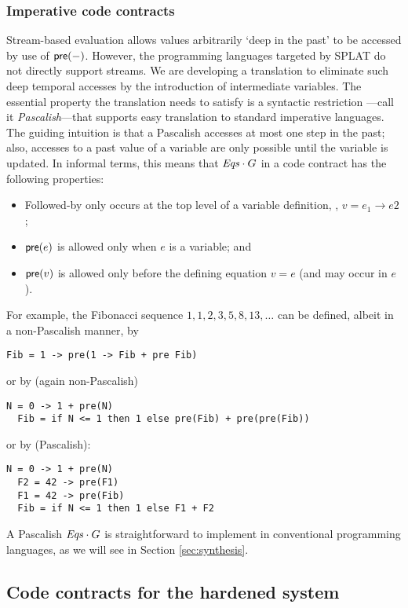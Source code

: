 \subsubsection*{Imperative code contracts}
Stream-based evaluation allows values arbitrarily `deep in the past'
to be accessed by use of $\mathsf{pre}(-)$. However, the programming
languages targeted by SPLAT do not directly support streams.  We are
developing a translation to eliminate such deep temporal accesses by
the introduction of intermediate variables. The essential property the
translation needs to satisfy is a syntactic restriction ---call
it \emph{Pascalish}---that supports easy translation to standard
imperative languages.  The guiding intuition is that a Pascalish
{\Eqs} accesses at most one step in the past; also, accesses to a
past value of a variable are only possible until the variable is
updated. In informal terms, this means that ${\mathit{Eqs}}\cdot G$ in a code
contract has the following properties:
\begin{itemize}
\item Followed-by only occurs at the top level of a variable definition, \eg, $v = e_1 \to e2$;
\item $\mathsf{pre}(e)$ is allowed only when $e$ is a variable; and
\item $\mathsf{pre}(v)$ is allowed only before the defining equation $v = e$ (and may occur in $e$).
\end{itemize}
For example, the Fibonacci sequence $1,1,2,3,5,8,13,\ldots$ can be
defined, albeit in a non-Pascalish manner, by
{\small
\begin{lstlisting}[style=agree]
  Fib = 1 -> pre(1 -> Fib + pre Fib)
\end{lstlisting}
}
\noindent or by (again non-Pascalish)
{\small
\begin{lstlisting}[style=agree]
  N = 0 -> 1 + pre(N)
  Fib = if N <= 1 then 1 else pre(Fib) + pre(pre(Fib))
\end{lstlisting}
}
\noindent or by (Pascalish):
{\small
\begin{lstlisting}[style=agree]
  N = 0 -> 1 + pre(N)
  F2 = 42 -> pre(F1)
  F1 = 42 -> pre(Fib)
  Fib = if N <= 1 then 1 else F1 + F2
\end{lstlisting}
} A Pascalish ${\mathit{Eqs}} \cdot G$ is straightforward to implement in
conventional programming languages, as we will see in
Section \ref{sec:synthesis}.

\subsection{Code contracts for the hardened system}

